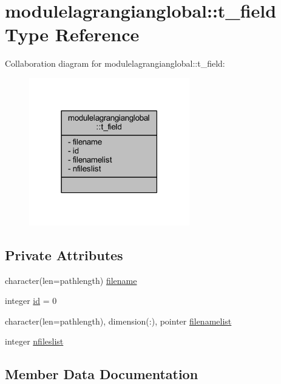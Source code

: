 \hypertarget{structmodulelagrangianglobal_1_1t__field}{}\section{modulelagrangianglobal\+:\+:t\+\_\+field Type Reference}
\label{structmodulelagrangianglobal_1_1t__field}


Collaboration diagram for modulelagrangianglobal\+:\+:t\+\_\+field\+:\nopagebreak
\begin{figure}[H]
\begin{center}
\leavevmode
\includegraphics[width=198pt]{structmodulelagrangianglobal_1_1t__field__coll__graph}
\end{center}
\end{figure}
\subsection*{Private Attributes}
\begin{DoxyCompactItemize}
\item 
character(len=pathlength) \mbox{\hyperlink{structmodulelagrangianglobal_1_1t__field_a2274787d005b8684bc722f5f1bb29b60}{filename}}
\item 
integer \mbox{\hyperlink{structmodulelagrangianglobal_1_1t__field_a8bf25cdb4740056af06cc73ca3f663ee}{id}} = 0
\item 
character(len=pathlength), dimension(\+:), pointer \mbox{\hyperlink{structmodulelagrangianglobal_1_1t__field_ac871f1ba16ed4c81348af5c3739dcd33}{filenamelist}}
\item 
integer \mbox{\hyperlink{structmodulelagrangianglobal_1_1t__field_ad1234084f2a3c324a1f7e55cbf5e3e1d}{nfileslist}}
\end{DoxyCompactItemize}


\subsection{Member Data Documentation}
\mbox{\label{structmodulelagrangianglobal_1_1t__field_a2274787d005b8684bc722f5f1bb29b60}} 

